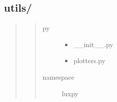 \documentclass[letterpaper,10pt,english]{sphinxmanual}
\begin{document}
\subsection{utils/}
\label{\detokenize{color:utils}}\begin{quote}
\begin{quote}\begin{description}
\item[{py}] \leavevmode\begin{itemize}
\item {} 
\_\_init\_\_.py

\item {} 
plotters.py

\end{itemize}

\item[{namespace}] \leavevmode
luxpy

\end{description}\end{quote}
\end{quote}
\label{\detokenize{color:module-luxpy.color.utils}}
\end{document}
